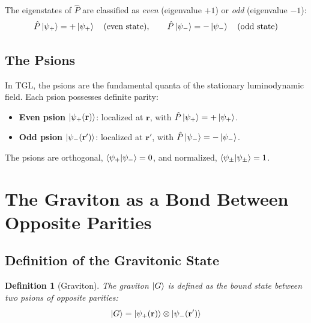 \documentclass[12pt,a4paper,twoside]{article}
\newtheorem{definition}[theorem]{Definition}
\newcommand{\psion}{\psi}
\begin{document}
\noindent The eigenstates of $\hat{P}$ are classified as \textit{even} (eigenvalue $+1$) or \textit{odd} (eigenvalue $-1$):
\begin{equation}
\hat{P}\ket{\psion_+} = +\ket{\psion_+} \quad\text{(even state)}, \qquad
\hat{P}\ket{\psion_-} = -\ket{\psion_-} \quad\text{(odd state)}
\label{eq:autoestados_paridade}
\end{equation}

\subsection{The Psions}

In TGL, the psions are the fundamental quanta of the stationary luminodynamic field. Each psion possesses definite parity:

\begin{itemize}[nosep]
\item \textbf{Even psion} $\ket{\psion_+(\mathbf{r})}$: localized at $\mathbf{r}$, with $\hat{P}\ket{\psion_+} = +\ket{\psion_+}$.
\item \textbf{Odd psion} $\ket{\psion_-(\mathbf{r}')}$: localized at $\mathbf{r}'$, with $\hat{P}\ket{\psion_-} = -\ket{\psion_-}$.
\end{itemize}

\noindent The psions are orthogonal, $\braket{\psion_+}{\psion_-} = 0$, and normalized, $\braket{\psion_\pm}{\psion_\pm} = 1$.


\section{The Graviton as a Bond Between Opposite Parities}


\subsection{Definition of the Gravitonic State}

\begin{definition}[Graviton]
The graviton $\ket{G}$ is defined as the bound state between two psions of opposite parities:
\begin{equation}
\ket{G} = \ket{\psion_+(\mathbf{r})} \otimes \ket{\psion_-(\mathbf{r}')}
\label{eq:graviton_def}
\end{equation}
\end{definition}
\end{document}
